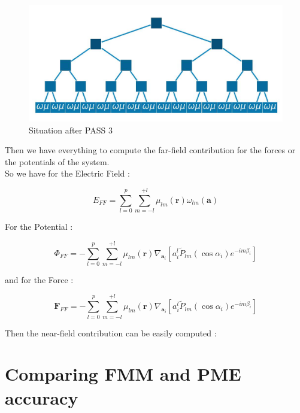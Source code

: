\documentclass[10pt,twoside,a4paper]{report}
\begin{document}
\begin{figure}[H]
	\label{fig:farfield}
   \includegraphics[scale=0.5]{farfield}
    \centering 
    \caption{Situation after PASS 3 }
    
   \end{figure} 
   
   Then we have everything to compute the far-field contribution for the forces or the potentials of the system.\\
   
   So we have for the Electric Field :
      
   \begin{equation}
   E_{FF} = \sum\limits_{l=0}^{p} \sum\limits_{m=-l}^{+l} \mu_{lm}(\textbf{r}) \omega_{lm}(\textbf{a})
   \end{equation}
   
   For the Potential :
 
 	\begin{equation}
   \Phi_{FF} = - \sum\limits_{l=0}^{p} \sum\limits_{m=-l}^{+l} \mu_{lm}(\textbf{r}) \nabla_{\textbf{a}_i}[a_i^l \widetilde{P}_{lm}(\cos\alpha_i)e^{-im\beta_i}]
   \end{equation}
   
   and for the Force :
   
   \begin{equation}
   \textbf{F}_{FF} = - \sum\limits_{l=0}^{p} \sum\limits_{m=-l}^{+l} \mu_{lm}(\textbf{r}) \nabla_{\textbf{a}_i}[a_i^l \widetilde{P}_{lm}(\cos\alpha_i)e^{-im\beta_i}]
   \end{equation}
   
 Then the near-field contribution can be easily computed : 

 

\chapter{Comparing FMM and PME accuracy}
\end{document}
